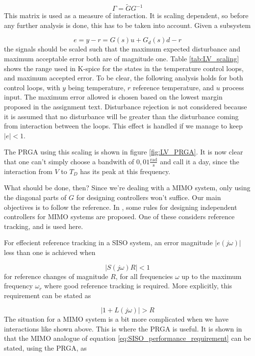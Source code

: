 \documentclass[12pt]{article}
\begin{document}
\begin{equation}
\Gamma = \tilde{G} G^{-1}
\end{equation}
This matrix is used as a measure of interaction. It is scaling dependent, so before any further analysis is done, this has to be taken into account. Given a subsystem

\begin{equation}
e = y - r = G(s) u + G_d(s) d - r
\end{equation}
the signals should be scaled such that the maximum expected disturbance and maximum acceptable error both are of magnitude one. Table \ref{tab:LV_scaling} shows the range used in K-spice for the states in the temperature control loops, and maximum accepted error. To be clear, the following analysis holds for both control loops, with $y$ being temperature, $r$ reference temperature, and $u$ process input. The maximum error allowed is chosen based on the lowest margin proposed in the assignment text. Disturbance rejection is not considered because it is assumed that no disturbance will be greater than the disturbance coming from interaction between the loops. This effect is handled if we manage to keep $| e | < 1$.

The PRGA using this scaling is shown in figure \ref{fig:LV_PRGA}. It is now clear that one can't simply choose a bandwith of $0,01 \frac{\textrm{rad}}{\textrm{s}}$ and call it a day, since the interaction from $V$ to $T_D$ has its peak at this frequency.

What should be done, then? Since we're dealing with a MIMO system, only using the diagonal parts of $G$ for designing controllers won't suffice. Our main objectives is to follow the reference. In \cite{skogestad}, some rules for designing independent controllers for MIMO systems are proposed. One of these considers reference tracking, and is used here.

For effecient reference tracking in a SISO system, an error magnitude $| e(j \omega) |$ less than one is achieved when

\begin{equation}
| S(j \omega) R | < 1
\end{equation}
for reference changes of magnitude $R$, for all frequencies $\omega$ up to the maximum frequency $\omega_r$ where good reference tracking is required. More explicitly, this requirement can be stated as

\begin{equation}
| 1 + L(j \omega) | > R
\label{eq:SISO_performance_requirement}
\end{equation}
The situation for a MIMO system is a bit more complicated when we have interactions like shown above. This is where the PRGA is useful. It is shown in \cite{skogestad} that the MIMO analogue of equation \ref{eq:SISO_performance_requirement} can be stated, using the PRGA, as
\end{document}
